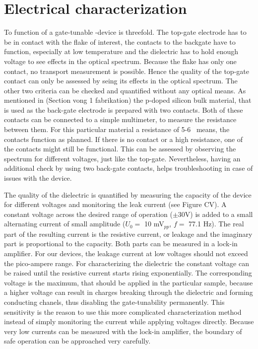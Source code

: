 \section{Electrical characterization}

To function of a gate-tunable \tmd-device is threefold. The top-gate electrode has to be in contact with the flake of interest, the contacts to the backgate have to function, especially at low temperature and the dielectric has to hold enough voltage to see effects in the optical spectrum. Because the flake has only one contact, no transport measurement is possible. Hence the quality of the top-gate contact can only be assessed by seing its effects in the optical spectrum. The other two criteria can be checked and quantified without any optical means. As mentioned in (Section vong 1 fabrikation) the p-doped silicon bulk material, that is used as the back-gate electrode is prepared with two contacts. Both of these contacts can be connected to a simple multimeter, to measure the resistance between them. For this particular material a resistance of 5-6 \Omega\ means, the contacts function as planned. If there is no contact or a high resistance, one of the contacts might still be functional. This can be assessed by observing the spectrum for different voltages, just like the top-gate. Nevertheless, having an additional check by using two back-gate contacts, helps troubleshooting in case of issues with the device.

The quality of the dielectric is quantified by measuring the capacity of the device for different voltages and monitoring the leak current (see Figure CV). A constant voltage across the desired range of operation ({\small$\pm $}30V) is added to a small alternating current of small amplitude ($U_0 = $ 10 mV$_{pp}$, $f = $ 77.1 Hz). The real part of the resulting current is the resistive current, or leakage and the imaginary part is proportional to the capacity. Both parts can be measured in a lock-in amplifier. For our devices, the leakage current at low voltages should not exceed the pico-ampere range. For characterizing the dielectric the constant voltage can be raised until the resistive current starts rising exponentially. The corresponding voltage is the maximum, that should be applied in the particular sample, because a higher voltage can result in charges breaking through the dielectric and forming conducting chanels, thus disabling the gate-tunability permanently. This sensitivity is the reason to use this more complicated characterization method instead of simply monitoring the current while applying voltages directly. Because very low currents can be measured with the lock-in amplifier, the boundary of safe operation can be approached very carefully.

